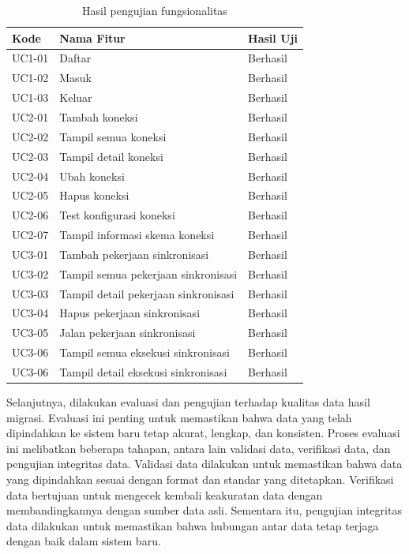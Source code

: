 \begin{table}
  \caption{Hasil pengujian fungsionalitas}
  \label{tab:fungsional}
  \centering
  \begin{tabular}{lll}
    \toprule
    \textbf{Kode} & \textbf{Nama Fitur} & \textbf{Hasil Uji} \\
    \midrule
    UC1-01 & Daftar & Berhasil \\
  UC1-02 & Masuk & Berhasil \\
 UC1-03 & Keluar & Berhasil \\
 UC2-01 & Tambah koneksi & Berhasil \\
 UC2-02 & Tampil semua koneksi & Berhasil \\
 UC2-03 & Tampil detail koneksi & Berhasil \\
UC2-04 & Ubah koneksi & Berhasil \\
 UC2-05 & Hapus koneksi & Berhasil \\
 UC2-06 & Test konfigurasi koneksi & Berhasil \\
 UC2-07 & Tampil informasi skema koneksi & Berhasil \\
 UC3-01 & Tambah pekerjaan sinkronisasi &  Berhasil\\
 UC3-02 & Tampil semua pekerjaan sinkronisasi & Berhasil \\
 UC3-03 & Tampil detail pekerjaan sinkronisasi & Berhasil \\
 UC3-04 & Hapus pekerjaan sinkronisasi & Berhasil \\
 UC3-05 & Jalan pekerjaan sinkronisasi & Berhasil \\
 UC3-06 & Tampil semua eksekusi sinkronisasi & Berhasil \\
 UC3-06 & Tampil detail eksekusi sinkronisasi & Berhasil \\
    \bottomrule
  \end{tabular}
\end{table}

Selanjutnya, dilakukan evaluasi dan pengujian terhadap kualitas data hasil migrasi. Evaluasi ini penting untuk memastikan bahwa data yang telah dipindahkan ke sistem baru tetap akurat, lengkap, dan konsisten. Proses evaluasi ini melibatkan beberapa tahapan, antara lain validasi data, verifikasi data, dan pengujian integritas data. Validasi data dilakukan untuk memastikan bahwa data yang dipindahkan sesuai dengan format dan standar yang ditetapkan. Verifikasi data bertujuan untuk mengecek kembali keakuratan data dengan membandingkannya dengan sumber data asli. Sementara itu, pengujian integritas data dilakukan untuk memastikan bahwa hubungan antar data tetap terjaga dengan baik dalam sistem baru.  
    
